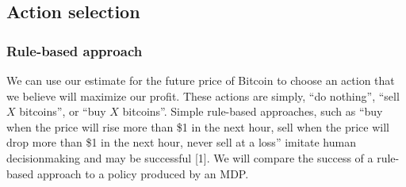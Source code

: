 \documentclass[10pt]{article}
\begin{document}
 
 \subsection*{Action selection}
 
\subsubsection*{Rule-based approach}
 We can use our estimate for the future price of Bitcoin to choose an action that we believe will maximize our profit. These actions are simply, ``do nothing'', ``sell $X$ bitcoins'', or ``buy $X$ bitcoins''. Simple rule-based approaches, such as ``buy when the price will rise more than \$1 in the next hour, sell when the price will drop more than \$1 in the next hour, never sell at a loss'' imitate human decisionmaking and may be successful [1].  We will compare the success of a rule-based approach to a policy produced by an MDP.
 	
\end{document}
